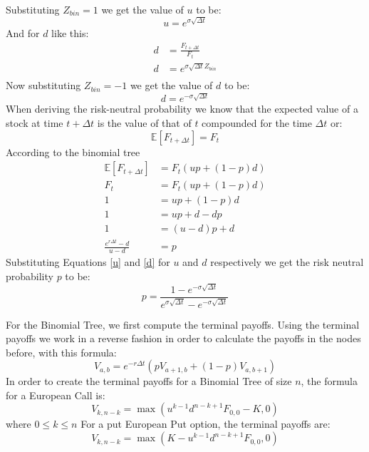 \documentclass[12pt]{article}
\numberwithin{equation}{section}
\begin{document}
Substituting $Z_{bin} = 1$ we get the value of $u$ to be:
\begin{equation}
	u = e^{\sigma  \sqrt{\Delta t}}
	\label{ub76}
\end{equation}
And for $d$ like this:
\begin{equation*}
	\begin{aligned}
		d &= \frac{F_{t+ \Delta t}}{F_t} \\
		d &= e^{\sigma  \sqrt{\Delta t} Z_{bin}} \\
	\end{aligned}
\end{equation*}
Now substituting $Z_{bin} = -1$ we get the value of $d$ to be:
\begin{equation}
	d = e^{-\sigma  \sqrt{\Delta t}}
	\label{db76}
\end{equation}
When deriving the risk-neutral probability we know that the expected value of a stock at time $t + \Delta t$ is the value of that of $t$ compounded for the time $\Delta t$ or:
\begin{equation}
	\mathbb{E}[F_{t + \Delta t}] = F_{t} 
\end{equation}
According to the binomial tree
\begin{equation*}
	\begin{aligned}
		\mathbb{E}[F_{t + \Delta t}] &= F_t (u p + (1-p)d) \\
		F_{t}  &= F_t (u p + (1-p)d) \\
		1 &= u p + (1-p)d \\
		1 &= u p + d- d p \\
		1 &= (u -d) p + d \\
		\frac{e ^{r\Delta t} - d}{u -d}  &= p
	\end{aligned}
\end{equation*}
Substituting Equations \ref{u} and \ref{d} for $u$ and $d$ respectively we get the risk neutral probability $p$ to be:
\begin{equation}
	p = \frac{1 - e^{-\sigma  \sqrt{\Delta t}}}{e^{\sigma  \sqrt{\Delta t}} -e^{-\sigma  \sqrt{\Delta t}}}  
	\label{pB76}
\end{equation}

For the Binomial Tree, we first compute the terminal payoffs. Using the terminal payoffs we work in a reverse fashion in order to calculate the payoffs in the nodes before, with this formula: 
\begin{equation}
	V_{a,b} = e^{-r\Delta t}(pV_{a+1,b} + (1-p)V_{a,b+1})
	\label{eq:expectedPayoffB76}
\end{equation}
In order to create the terminal payoffs for a Binomial Tree of size $n$, the formula for a European Call is:
\begin{equation}
	V_{k,n-k} = \max(u^{k-1}d^{n-k+1}F_{0,0} - K, 0)
	\label{terminalpayoffB76}
\end{equation}
where $0 \leq k \leq n$ \newline
For a put European Put option, the terminal payoffs are:
\begin{equation}
	V_{k,n-k} = \max(K - u^{k-1}d^{n-k+1}F_{0,0}, 0)
	\label{terminalpayoffB76Put}
\end{equation}
\newpage
\end{document}
